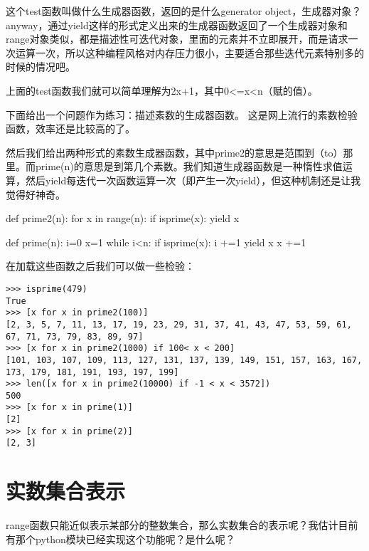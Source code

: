 \documentclass[12pt,oneside]{book}
\begin{document}
\begin{common-format}
这个test函数叫做什么生成器函数，返回的是什么generator object，生成器对象？anyway，通过yield这样的形式定义出来的生成器函数返回了一个生成器对象和range对象类似，都是描述性可迭代对象，里面的元素并不立即展开，而是请求一次运算一次，所以这种编程风格对内存压力很小，主要适合那些迭代元素特别多的时候的情况吧。

上面的test函数我们就可以简单理解为2x+1，其中0<=x<n（赋的值）。

下面给出一个问题作为练习：描述素数的生成器函数。
这是网上流行的素数检验函数，效率还是比较高的了。

然后我们给出两种形式的素数生成器函数，其中prime2的意思是范围到（to）那里。而prime(n)的意思是到第几个素数。我们知道生成器函数是一种惰性求值运算，然后yield每迭代一次函数运算一次（即产生一次yield），但这种机制还是让我觉得好神奇。

\begin{tcbpython}
def prime2(n):
    for x in range(n):
        if isprime(x):
            yield x

def prime(n):
    i=0
    x=1
    while i<n:
        if isprime(x):
            i +=1
            yield x
        x +=1
\end{tcbpython}

在加载这些函数之后我们可以做一些检验：
\begin{Verbatim}
>>> isprime(479)
True
>>> [x for x in prime2(100)]
[2, 3, 5, 7, 11, 13, 17, 19, 23, 29, 31, 37, 41, 43, 47, 53, 59, 61, 67, 71, 73, 79, 83, 89, 97]
>>> [x for x in prime2(1000) if 100< x < 200]
[101, 103, 107, 109, 113, 127, 131, 137, 139, 149, 151, 157, 163, 167, 173, 179, 181, 191, 193, 197, 199]
>>> len([x for x in prime2(10000) if -1 < x < 3572])
500
>>> [x for x in prime(1)]
[2]
>>> [x for x in prime(2)]
[2, 3]
\end{Verbatim}


\section{实数集合表示}
range函数只能近似表示某部分的整数集合，那么实数集合的表示呢？我估计目前有那个python模块已经实现这个功能呢？是什么呢？


\end{common-format}
\end{document}
